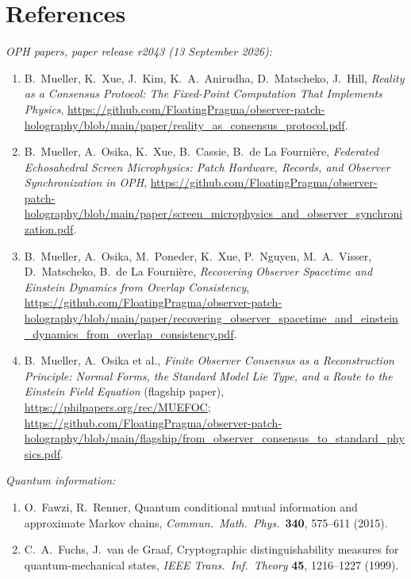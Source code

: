 \documentclass[11pt]{article}
\begin{document}
{\footnotesize
\section*{References}
\vspace{-0.4ex}
\emph{OPH papers, paper release r2043 (13 September 2026):}
\begin{enumerate}[leftmargin=4.3em,labelwidth=3.8em,labelsep=0.5em,align=right,itemsep=0.15ex]
\item[{[C]}] B.~Mueller, K.~Xue, J.~Kim, K.~A.~Anirudha, D.~Matscheko, J.~Hill,
\emph{Reality as a Consensus Protocol: The Fixed-Point Computation That Implements Physics},
\url{https://github.com/FloatingPragma/observer-patch-holography/blob/main/paper/reality_as_consensus_protocol.pdf}.
\item[{[SM]}] B.~Mueller, A.~Osika, K.~Xue, B.~Cassie, B.~de La Fourni\`ere,
\emph{Federated Echosahedral Screen Microphysics: Patch Hardware, Records, and Observer Synchronization in OPH},
\url{https://github.com/FloatingPragma/observer-patch-holography/blob/main/paper/screen_microphysics_and_observer_synchronization.pdf}.
\item[{[ST]}] B.~Mueller, A.~Osika, M.~Poneder, K.~Xue, P.~Nguyen, M.~A.~Visser, D.~Matscheko, B.~de La Fourni\`ere,
\emph{Recovering Observer Spacetime and Einstein Dynamics from Overlap Consistency},
\url{https://github.com/FloatingPragma/observer-patch-holography/blob/main/paper/recovering_observer_spacetime_and_einstein_dynamics_from_overlap_consistency.pdf}.
\item[{[FL]}] B.~Mueller, A.~Osika et al.,
\emph{Finite Observer Consensus as a Reconstruction Principle: Normal Forms, the Standard Model Lie Type, and a Route to the Einstein Field Equation} (flagship paper),
\url{https://philpapers.org/rec/MUEFOC};
\url{https://github.com/FloatingPragma/observer-patch-holography/blob/main/flagship/from_observer_consensus_to_standard_physics.pdf}.
\end{enumerate}
\vspace{-0.4ex}
\emph{Quantum information:}
\begin{enumerate}[leftmargin=4.3em,labelwidth=3.8em,labelsep=0.5em,align=right,itemsep=0.15ex]
\item[{[FR]}] O.~Fawzi, R.~Renner, Quantum conditional mutual information and approximate Markov chains, \emph{Commun.\ Math.\ Phys.}\ \textbf{340}, 575--611 (2015).
\item[{[FvdG]}] C.~A.~Fuchs, J.~van de Graaf, Cryptographic distinguishability measures for quantum-mechanical states, \emph{IEEE Trans.\ Inf.\ Theory} \textbf{45}, 1216--1227 (1999).

\end{enumerate}}
\end{document}
